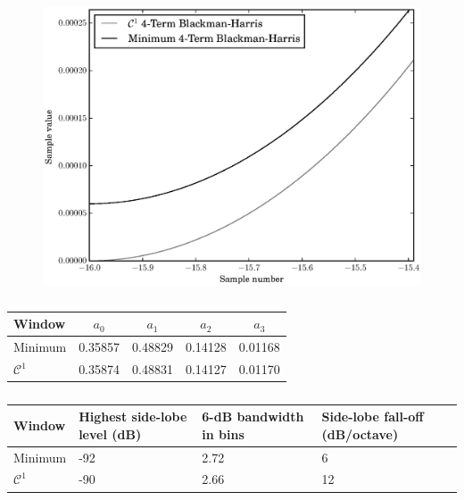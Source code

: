 \begin{figure}[!t]
    \centering
    \includegraphics[width=\figwidthscale\textwidth]{plots/c1_vs_min_blackman_closeup.eps}
    \CaptionWithTitle{%
    }{\label{plot:c1vsminblackmancloseup}}
\end{figure}

\begin{table}
    \caption{\label{tab:optblackman}}
    \begin{center}
        \begin{tabular}{l c c c c }
            Window & $a_0$ & $a_1$ & $a_2$ & $a_3$ \\
            \hline
            Minimum & 0.35857 & 0.48829 & 0.14128 &
            0.01168 \\
            $\mathcal{C}^{1}$ & 0.35874 & 0.48831 &
            0.14127 & 0.01170
        \end{tabular}
    \end{center}
\end{table}

\begin{table}
    \caption{\label{tab:optvs4termblackman}}
    \begin{center}
        \begin{tabular}{l p{} p{} p{}}
            Window & Highest side-lobe level (dB) & 6-dB bandwidth in bins &
            Side-lobe fall-off (dB/octave) \\
            \hline
            Minimum & -92 & 2.72 & 6 \\
            $\mathcal{C}^{1}$ & -90 & 2.66 & 12 \\
        \end{tabular}
    \end{center}
\end{table}

